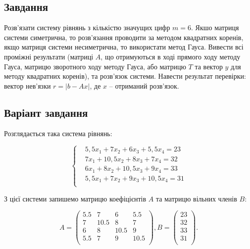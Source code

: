 \documentclass[a4paper,14pt]{extarticle} %
\begin{document}


\newpage

\subsection*{Завдання}

Розв’язати систему рівнянь з кількістю значущих цифр $m=6$. Якшо матриця системи
симетрична, то розв’язання проводити за методом квадратних коренів, якщо матриця системи
несиметрична, то використати метод Гауса. Вивести всі проміжні результати (матриці $A$, що
отримуються в ході прямого ходу методу Гауса, матрицю зворотного ходу методу Гауса, або
матрицю $T$ та вектор $y$ для методу квадратних коренів), та розв’язок системи. Навести 
результат перевірки: вектор нев'язки $r = |b - Ax|$, де $x$ -- отриманий розв’язок.

\subsection*{Варіант завдання}

Розглядається така система рівнянь:

\begin{equation}
    \left\{
    \begin{aligned}
        &5{,}5x_1 + 7x_2 + 6x_3 + 5{,}5x_4 = 23 \\
        &7x_1 + 10{,}5x_2 + 8x_3 + 7x_4 = 32 \\
        &6x_1 + 8x_2 + 10{,}5x_3 + 9x_4 = 33 \\
        &5{,}5x_1 + 7x_2 + 9x_3 + 10{,}5x_4 = 31 \\
    \end{aligned} \label{equations}
    \right.
\end{equation}

З цієї системи запишемо матрицю коефіцієнтів $A$ та матрицю вільних членів $B$:

\[
A=
    \begin{pmatrix}
        5.5 & 7 & 6 & 5.5 \\
        7 & 10.5 & 8 & 7 \\
        6 & 8 & 10.5 & 9 \\
        5.5 & 7 & 9 & 10.5 \\
    \end{pmatrix},
B = 
    \begin{pmatrix}
        23 \\
        32 \\
        33 \\
        31 \\
    \end{pmatrix}.
\]
\end{document}
